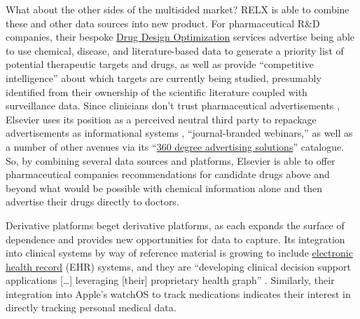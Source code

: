 \documentclass{article}
\begin{document}
What about the other sides of the multisided market? RELX is able to
combine these and other data sources into new product. For
pharmaceutical R\&D companies, their bespoke
\href{https://web.archive.org/web/20211207070524/https://www.elsevier.com/solutions/professional-services/drug-design-optimization}{Drug
Design Optimization} services advertise being able to use chemical,
disease, and literature-based data to generate a priority list of
potential therapeutic targets and drugs, as well as provide
``competitive intelligence'' about which targets are currently being
studied, presumably identified from their ownership of the scientific
literature coupled with surveillance data. Since clinicians don't trust
pharmaceutical advertisements \cite{elsevierMakingMedicalInformation2021} , Elsevier uses its position as
a perceived neutral third party to repackage advertisements as
informational systems \cite{elsevierRethinkClincalContent2020} ,
``journal-branded webinars,'' as well as a number of other avenues via
its
``\href{https://web.archive.org/web/20211111211058/https://www.elsevier.com/advertising-reprints-supplements/advertising}{360
degree advertising solutions}'' catalogue. So, by combining several data
sources and platforms, Elsevier is able to offer pharmaceutical
companies recommendations for candidate drugs above and beyond what
would be possible with chemical information alone and then advertise
their drugs directly to doctors.

Derivative platforms beget derivative platforms, as each expands the
surface of dependence and provides new opportunities for data to
capture. Its integration into clinical systems by way of reference
material is growing to include
\href{https://web.archive.org/web/20230307020432/https://www.elsevier.com/en-gb/clinical-solutions/clinical-practice}{electronic
health record} (EHR) systems, and they are ``developing clinical
decision support applications {[}\ldots{]} leveraging {[}their{]}
proprietary health graph'' \cite{relxAnnualReport20222023} .
Similarly, their integration into Apple's watchOS to track medications
indicates their interest in directly tracking personal medical data.
\end{document}
